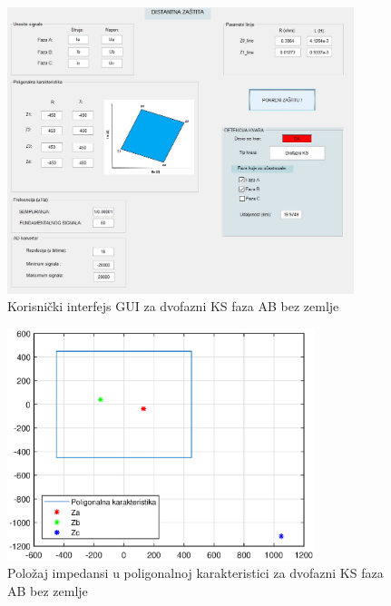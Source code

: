 \begin{figure}[H]
  \centering
  \includegraphics[width=0.9\textwidth]{Rezultati1/gui_2F_AB.jpg}
  \caption{Korisnički interfejs GUI za dvofazni KS faza AB bez zemlje}
  \label{fig:63}
\end{figure}


\begin{figure}[H]
  \centering
  \includegraphics[width=0.8\textwidth]{Rezultati1/karakteristika_2F_AB.eps}
  \caption{Položaj impedansi u poligonalnoj karakteristici za dvofazni KS faza AB bez zemlje }
  \label{fig:64}
\end{figure}

